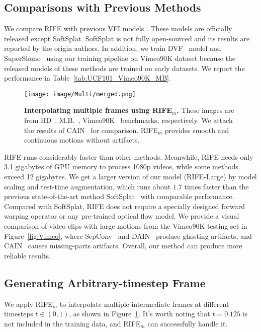 \documentclass[final]{cvpr}
\begin{document}
\subsection{Comparisons with Previous Methods}
\label{sec:comparison}

We compare RIFE with previous VFI models  \cite{xue2019video, Niklaus_ICCV_2017, bao2019memc, bao2019depth, choi2020channel, niklaus2020softmax, park2020bmbc, cheng2020video, lee2020adacof, ding2021cdfi, cheng2020multiple}. These models are officially released except SoftSplat. SoftSplat is not fully open-sourced and its results are reported by the origin authors. In addition, we train DVF~\cite{liu2017video} model and SuperSlomo~\cite{jiang2018super} using our training pipeline on Vimeo90K dataset because the released models of these methods are trained on early datasets. We report the performance in Table~\ref{tab:UCF101_Vimeo90K_MB}.

\begin{figure}[t]
	\centering
	\texttt{[image: image/Multi/merged.png]}
	\caption{\textbf{Interpolating multiple frames using RIFE$_m$.} These images are from HD~\cite{bao2019depth}, M.B.~\cite{baker2011database}, Vimeo90K~\cite{xue2019video} benchmarks, respectively. We attach the results of CAIN~\cite{choi2020channel} for comparison. RIFE$_m$ provides smooth and continuous motions without artifacts.}\label{fig:multi}
\end{figure}

RIFE runs considerably faster than other methods. Meanwhile, RIFE needs only 3.1 gigabytes of GPU memory to process 1080p videos, while some methods exceed 12 gigabytes. We get a larger version of our model (RIFE-Large) by model scaling and test-time augmentation, which runs about $1.7$ times faster than the previous state-of-the-art method SoftSplat~\cite{niklaus2020softmax} with comparable performance. Compared with SoftSplat, RIFE does not require a specially designed forward warping operator or any pre-trained optical flow model. We provide a visual comparison of video clips with large motions from the Vimeo90K testing set in Figure~\ref{fig:Vimeo}, where SepConv~\cite{Niklaus_ICCV_2017} and DAIN~\cite{bao2019depth} produce ghosting artifacts, and CAIN~\cite{choi2020channel} causes missing-parts artifacts. Overall, our method can produce more reliable results.

\subsection{Generating Arbitrary-timestep Frame}
\label{sec:model_multi}
We apply RIFE$_m$ to interpolate multiple intermediate frames at different timesteps $t \in (0, 1)$, as shown in Figure~\ref{fig:multi}. It's worth noting that $t=0.125$ is not included in the training data, and RIFE$_m$ can successfully handle it.
\end{document}
